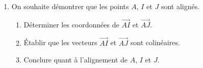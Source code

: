 \begin{exo}{}
\begin{enumerate}
		\item %
		      On souhaite démontrer que les points $A$, $I$ et $J$ sont alignés.
		      \begin{enumerate}
			      \item Déterminer les coordonnées de $\vec{AI}$ et $\vec{AJ}$.
			      \item Établir que les vecteurs $\vec{AI}$ et $\vec{AJ}$ sont colinéaires. \item Conclure quant à l'alignement de $A$, $I$ et $J$.
		      \end{enumerate}
	\end{enumerate}
\end{exo}
